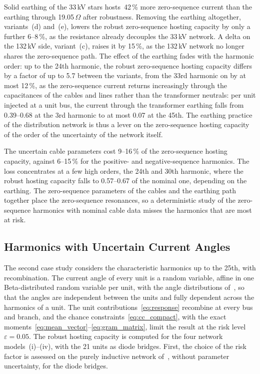 Solid earthing of the 33\,kV stars hosts~42\,\% more zero-sequence current than the earthing through 19.05\,$\Omega$ after robustness. Removing the earthing altogether, variants~(d) and~(e), lowers the robust zero-sequence hosting capacity by only a further 6--8\,\%, as the resistance already decouples the 33\,kV network. A delta on the 132\,kV side, variant~(c), raises it by 15\,\%, as the 132\,kV network no longer shares the zero-sequence path. The effect of the earthing fades with the harmonic order: up to the 24th harmonic, the robust zero-sequence hosting capacity differs by a factor of up to 5.7 between the variants, from the 33rd harmonic on by at most 12\,\%, as the zero-sequence current returns increasingly through the capacitances of the cables and lines rather than the transformer neutrals: per unit injected at a unit bus, the current through the transformer earthing falls from 0.39--0.68 at the 3rd harmonic to at most 0.07 at the 45th. The earthing practice of the distribution network is thus a lever on the zero-sequence hosting capacity of the order of the uncertainty of the network itself.

The uncertain cable parameters cost 9--16\,\% of the zero-sequence hosting capacity, against 6--15\,\% for the positive- and negative-sequence harmonics. The loss concentrates at a few high orders, the 24th and 30th harmonic, where the robust hosting capacity falls to 0.57--0.67 of the nominal one, depending on the earthing. The zero-sequence parameters of the cables and the earthing path together place the zero-sequence resonances, so a deterministic study of the zero-sequence harmonics with nominal cable data misses the harmonics that are most at risk.

\subsection{Harmonics with Uncertain Current Angles}
\label{sec:ieee30_physical}\label{sec:risk_factor_results}

The second case study considers the characteristic harmonics up to the 25th,  with recombination. The current angle of every unit is a random variable, affine in one Beta-distributed random variable per unit, with the angle distributions of~\cite{vanacker_shhc}, so that the angles are independent between the units and fully dependent across the harmonics of a unit. The unit contributions~\eqref{eq:response} recombine at every bus and branch, and the chance constraints~\eqref{eq:cc_compact}, with the exact moments~\eqref{eq:mean_vector}--\eqref{eq:gram_matrix}, limit the result at the risk level~$\varepsilon = 0.05$. The robust hosting capacity is computed for the four network models~(i)--(iv), with the 21 units as diode bridges. First, the choice of the risk factor is assessed on the purely inductive network of~\cite{vanacker_shhc}, without parameter uncertainty, for the diode bridges. 


